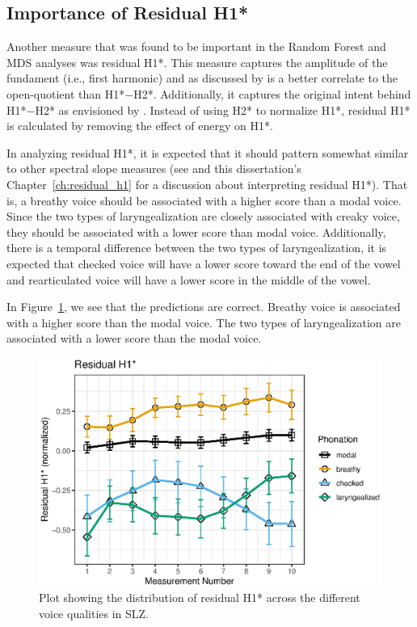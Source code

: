 \subsection{Importance of Residual H1*} \label{sec:rh1_discussion}

Another measure that was found to be important in the Random Forest and MDS analyses was residual H1*. This measure captures the amplitude of the fundament (i.e., first harmonic) and as discussed by \citet{chaiH1H2AcousticMeasure2022} is a better correlate to the open-quotient than H1*$-$H2*. Additionally, it captures the original intent behind H1*$-$H2* as envisioned by \citet{fischer-jorgensenPhoneticAnalysisBreathy1968}. Instead of using H2* to normalize H1*, residual H1* is calculated by removing the effect of energy on H1*. 

In analyzing residual H1*, it is expected that it should pattern somewhat similar to other spectral slope measures (see \cite{chaiH1H2AcousticMeasure2022} and this dissertation's Chapter~\ref{ch:residual_h1} for a discussion about interpreting residual H1*). That is, a breathy voice should be associated with a higher score than a modal voice. Since the two types of laryngealization are closely associated with creaky voice, they should be associated with a lower score than modal voice. Additionally, there is a temporal difference between the two types of laryngealization, it is expected that checked voice will have a lower score toward the end of the vowel and rearticulated voice will have a lower score in the middle of the vowel. 

In Figure~\ref{fig:residualH1}, we see that the predictions are correct. Breathy voice is associated with a higher score than the modal voice. The two types of laryngealization are associated with a lower score than the modal voice.

\begin{figure}[h!]
    \centering
    \includegraphics[width = 0.9\linewidth]{images/slz_residual_h1c.eps}
    \caption{Plot showing the distribution of residual H1* across the different voice qualities in SLZ.}
    \label{fig:residualH1}
\end{figure}

